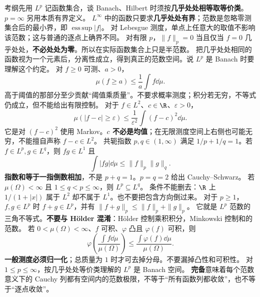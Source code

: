 考纲先用 $L^p$ 记函数集合，谈 Banach、Hilbert 时须按\textbf{几乎处处相等取等价类}。$p=\infty$ 另用本质有界定义。
$L^\infty$ 中的函数只要求\textbf{几乎处处有界}；范数是忽略零测集合后的最小界，即 $\operatorname*{ess\,sup}|f|$。
对 Lebesgue 测度，单点上任意大的取值不影响该范数；这与普通的逐点上确界不同。
对有限 $p$，$\|f\|_p=0$ 当且仅当 $f=0$ 几乎处处，\textbf{不必处处为零}。所以在实际函数集合上只是半范数。
把几乎处处相同的函数视为一个元素后，分离性成立，得到真正的范数空间。说 $L^p$ 是 Banach 时要理解这个约定。
对 $f\ge0$ 可测、$a>0$，
\[
\mu(f\ge a)\le\frac1a\int f\dd\mu.
\]
高于阈值的那部分至少贡献“阈值乘质量”。不要求概率测度；积分若无穷，不等式仍成立，但不能给出有限控制。
对于 $f\in L^2$、$c\in\R$、$\varepsilon>0$，
\[
\mu(|f-c|\ge\varepsilon)\le\frac1{\varepsilon^2}\int(f-c)^2\dd\mu.
\]
它是对 $(f-c)^2$ 使用 Markov。\textbf{$c$ 不必是均值}；在无限测度空间上右侧也可能无穷，不能擅自声称 $f-c\in L^2$。
共轭指数 $p,q\in(1,\infty)$ 满足 $1/p+1/q=1$。若 $f\in L^p,g\in L^q$，则 $fg\in L^1$ 且
\[
\int|fg|\dd\mu\le\|f\|_p\|g\|_q.
\]
\textbf{指数和等于一指倒数相加}，不是 $p+q=1$。$p=q=2$ 给出 Cauchy–Schwarz。
若\textbf{$\mu(\Omega)<\infty$} 且 $1\le q<p\le\infty$，则 $L^p\subseteq L^q$。
条件不能删去：$\R$ 上 $1/(1+|x|)$ 属于 $L^2$ 却不属于 $L^1$。也不要把包含方向倒过来。
对于 $p\ge1$，$f,g\in L^p$ 时 $f+g\in L^p$，并有 $\|f+g\|_p\le\|f\|_p+\|g\|_p$。
它就是 $L^p$ 范数的三角不等式。\textbf{不要与 Hölder 混淆}：Hölder 控制乘积积分，Minkowski 控制和的范数。
若 $0<\mu(\Omega)<\infty$、$f$ 可积、$\varphi$ 凸且 $\varphi(f)$ 可积，则
\[
\varphi\!\left(\frac{\int f\dd\mu}{\mu(\Omega)}\right)\le
\frac{\int\varphi(f)\dd\mu}{\mu(\Omega)}.
\]
\textbf{一般测度必须归一化}；总质量为 $1$ 时才可去掉分母。不要漏掉凸性和可积性。
对 $1\le p\le\infty$，按几乎处处等价类理解的 $L^p$ 是 Banach 空间。
\textbf{完备}意味着每个范数意义下的 Cauchy 列都有空间内的范数极限，不等于“所有函数列都收敛”，也不等于“逐点收敛”。
